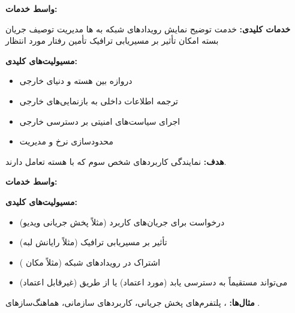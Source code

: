 \textbf{واسط خدمات:} 

\textbf{خدمات کلیدی:}\CNbr{}\lr{\textbar{}} خدمت \lr{\textbar{}} توضیح \lr{\textbar{}}\CNbr{}\CNbr{} نمایش رویدادهای شبکه به ها \lr{\textbar{}}\CNbr{} مدیریت توصیف جریان بسته \lr{\textbar{}}\CNbr{} امکان تأثیر  بر مسیریابی ترافیک \lr{\textbar{}}\CNbr{} تأمین رفتار مورد انتظار  \lr{\textbar{}}

\textbf{مسیولیت‌های کلیدی:}

\begin{itemize}
\tightlist
\item
  دروازه  بین هسته  و دنیای خارجی
\item
  ترجمه اطلاعات داخلی  به بازنمایی‌های خارجی
\item
  اجرای سیاست‌های امنیتی بر دسترسی خارجی
\item
  محدودسازی نرخ و مدیریت 
\end{itemize}


\textbf{هدف:} نمایندگی کاربردهای شخص سوم که با هسته  تعامل دارند.

\textbf{واسط خدمات:} 

\textbf{مسیولیت‌های کلیدی:}

\begin{itemize}
\tightlist
\item
  درخواست  برای جریان‌های کاربرد (مثلاً پخش جریانی ویدیو)
\item
  تأثیر بر مسیریابی ترافیک (مثلاً رایانش لبه)
\item
  اشتراک در رویدادهای شبکه (مثلاً مکان )
\item
  می‌تواند مستقیماً به  دسترسی یابد (مورد اعتماد) یا از طریق  (غیرقابل اعتماد)
\end{itemize}

\textbf{مثال‌ها:} ، پلتفرم‌های پخش جریانی، کاربردهای سازمانی، هماهنگ‌سازهای .


